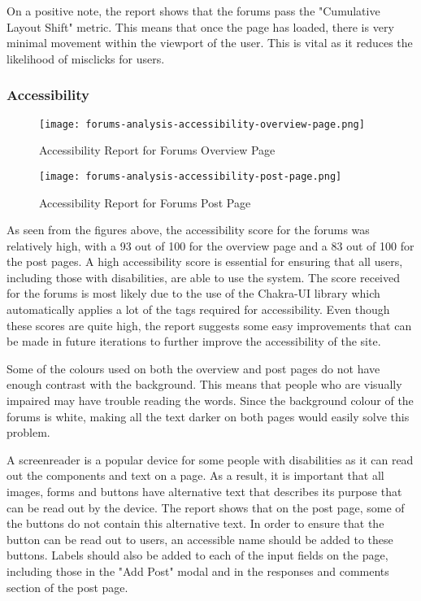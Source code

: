 On a positive note, the report shows that the forums pass the "Cumulative Layout Shift" metric.
This means that once the page has loaded, there is very minimal movement within the viewport of the user.
This is vital as it reduces the likelihood of misclicks for users.

\subsubsection{Accessibility}

\begin{figure}[h!]
    \texttt{[image: forums-analysis-accessibility-overview-page.png]}
    \centering
    \caption{Accessibility Report for Forums Overview Page}
\end{figure}

\begin{figure}[h!]
    \texttt{[image: forums-analysis-accessibility-post-page.png]}
    \centering
    \caption{Accessibility Report for Forums Post Page}
\end{figure}

As seen from the figures above, the accessibility score for the forums was relatively high, with a 93 out of 100 for the overview page and a 83 out of 100 for the post pages.
A high accessibility score is essential for ensuring that all users, including those with disabilities, are able to use the system.
The score received for the forums is most likely due to the use of the Chakra-UI library which automatically applies a lot of the tags required for accessibility.
Even though these scores are quite high, the report suggests some easy improvements that can be made in future iterations to further improve the accessibility of the site.

Some of the colours used on both the overview and post pages do not have enough contrast with the background.
This means that people who are visually impaired may have trouble reading the words.
Since the background colour of the forums is white, making all the text darker on both pages would easily solve this problem.

A screenreader is a popular device for some people with disabilities as it can read out the components and text on a page.
As a result, it is important that all images, forms and buttons have alternative text that describes its purpose that can be read out by the device.
The report shows that on the post page, some of the buttons do not contain this alternative text.
In order to ensure that the button can be read out to users, an accessible name should be added to these buttons.
Labels should also be added to each of the input fields on the page, including those in the "Add Post" modal and in the responses and comments section of the post page.